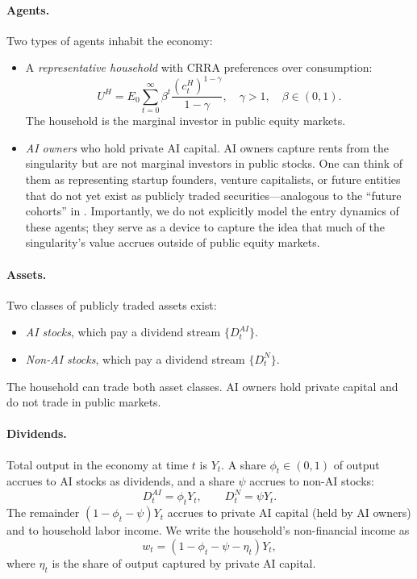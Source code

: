 \documentclass[12pt]{article}
\begin{document}
\paragraph{Agents.} Two types of agents inhabit the economy:
\begin{itemize}
    \item A \emph{representative household} with CRRA preferences over consumption:
    \begin{equation}
        U^H = E_0 \sum_{t=0}^{\infty} \beta^t \frac{(c_t^H)^{1-\gamma}}{1-\gamma}, \quad \gamma > 1, \quad \beta \in (0,1). \label{eq:household_utility}
    \end{equation}
    The household is the marginal investor in public equity markets.

    \item \emph{AI owners} who hold private AI capital. AI owners capture rents from the singularity but are not marginal investors in public stocks. One can think of them as representing startup founders, venture capitalists, or future entities that do not yet exist as publicly traded securities---analogous to the ``future cohorts'' in \citet{GKP2012}. Importantly, we do not explicitly model the entry dynamics of these agents; they serve as a device to capture the idea that much of the singularity's value accrues outside of public equity markets.
\end{itemize}

\paragraph{Assets.} Two classes of publicly traded assets exist:
\begin{itemize}
    \item \emph{AI stocks}, which pay a dividend stream $\{D_t^{AI}\}$.
    \item \emph{Non-AI stocks}, which pay a dividend stream $\{D_t^{N}\}$.
\end{itemize}
The household can trade both asset classes. AI owners hold private capital and do not trade in public markets.

\paragraph{Dividends.} Total output in the economy at time $t$ is $Y_t$. A share $\phi_t \in (0,1)$ of output accrues to AI stocks as dividends, and a share $\psi$ accrues to non-AI stocks:
\begin{equation}
    D_t^{AI} = \phi_t Y_t, \qquad D_t^{N} = \psi Y_t. \label{eq:dividends}
\end{equation}
The remainder $(1 - \phi_t - \psi) Y_t$ accrues to private AI capital (held by AI owners) and to household labor income. We write the household's non-financial income as
\begin{equation}
    w_t = (1 - \phi_t - \psi - \eta_t) Y_t, \label{eq:labor_income}
\end{equation}
where $\eta_t$ is the share of output captured by private AI capital.
\end{document}

